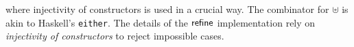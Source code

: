 \documentclass[sigplan,review,anonymous]{acmart}
\begin{document}
\begin{code}
\AgdaOperator{\AgdaFunction{]′}}\AgdaSymbol{)}\AgdaSpace{}%
\AgdaSymbol{(}\AgdaSpace{}%
\AgdaSymbol{\AgdaUnderscore{})}\<%
\\
%
\>[4]\AgdaSymbol{;}\AgdaSpace{}%
\AgdaSpace{}%
\AgdaSymbol{=}\AgdaSpace{}%
\<%
\\
%
\>[4]\AgdaSymbol{\}}\<%
\\
%
\>[4]\<%
\\
\>[4][@{}l@{\AgdaIndent{0}}]%
\>[6]\AgdaSpace{}%
\AgdaSymbol{:}\AgdaSpace{}%
\AgdaSymbol{(}\AgdaSpace{}%
\AgdaSymbol{:}\AgdaSpace{}%
\AgdaSymbol{)}\AgdaSpace{}%
\AgdaSpace{}%
\AgdaSymbol{(}\AgdaSpace{}%
\AgdaSymbol{:}\AgdaSpace{}%
\AgdaSymbol{)}\AgdaSpace{}%
\AgdaSpace{}%
\AgdaOperator{\AgdaFunction{[}}\AgdaSpace{}%
\AgdaSpace{}%
\AgdaSpace{}%
\AgdaOperator{\AgdaFunction{,}}\AgdaSpace{}%
\AgdaSpace{}%
\AgdaOperator{\AgdaFunction{]′}}\AgdaSpace{}%
\AgdaSymbol{(}\AgdaSpace{}%
\AgdaSymbol{)}\AgdaSpace{}%
\AgdaSpace{}%
\AgdaSpace{}%
\AgdaSpace{}%
\AgdaSpace{}%
\AgdaSpace{}%
\AgdaSymbol{(}\AgdaSpace{}%
\AgdaSymbol{)}\AgdaSpace{}%
\AgdaSpace{}%
\<%
\\
%
\>[6]\AgdaSpace{}%
\AgdaSpace{}%
\AgdaSpace{}%
\AgdaSpace{}%
\AgdaSpace{}%
\AgdaSpace{}%
\AgdaSpace{}%
\AgdaSymbol{|}\AgdaSpace{}%
\AgdaSpace{}%
\AgdaSpace{}%
\<%
\\
%
\>[6]\AgdaSpace{}%
\AgdaSpace{}%
\AgdaSpace{}%
\AgdaSymbol{()}\AgdaSpace{}%
\AgdaSymbol{|}\AgdaSpace{}%
\AgdaSpace{}%
\AgdaSpace{}%
\AgdaSymbol{|}\AgdaSpace{}%
\AgdaSymbol{\AgdaUnderscore{}}\<%
\\
%
\>[6]\AgdaSpace{}%
\AgdaSpace{}%
\AgdaSymbol{\AgdaUnderscore{}}\AgdaSpace{}%
\AgdaSpace{}%
\AgdaSymbol{|}\AgdaSpace{}%
\AgdaSpace{}%
\AgdaSpace{}%
\AgdaSymbol{|}\AgdaSpace{}%
\AgdaOperator{\AgdaInductiveConstructor{[}}\AgdaSpace{}%
\AgdaSpace{}%
\AgdaOperator{\AgdaInductiveConstructor{]}}\AgdaSpace{}%
\AgdaSymbol{=}\AgdaSpace{}%
\AgdaSpace{}%
\AgdaSymbol{(}\AgdaSpace{}%
\AgdaSpace{}%
\AgdaSymbol{(}\AgdaSpace{}%
\AgdaSymbol{))}\AgdaSpace{}%
\AgdaSymbol{(}\AgdaSpace{}%
\AgdaSymbol{)}\<%
\end{code}
\noindent where injectivity of constructors is used in a crucial way.
The combinator  for $⊎$ is akin to Haskell's \texttt{either}.
The details of the $\AgdaFunction{refine}$ implementation rely on
\emph{injectivity of constructors} to reject impossible cases.
\end{document}
